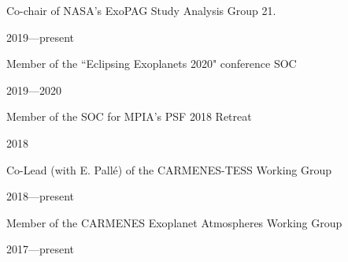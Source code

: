 \documentclass[12pt, a4paper]{article} %
\begin{document}
\vspace{0.2cm}

\begin{minipage}[t]{0.7\textwidth}
\begin{flushleft}%
  \setlength{\leftskip}{0.2cm}%
Co-chair of NASA's ExoPAG Study Analysis Group 21.
\end{flushleft}
\end{minipage}
\begin{minipage}[t]{0.3\textwidth}
\hfill 2019---present
\end{minipage}

\vspace{0.2cm}

\begin{minipage}[t]{0.7\textwidth}
\begin{flushleft}%
  \setlength{\leftskip}{0.2cm}%
Member of the ``Eclipsing Exoplanets 2020" conference SOC
\end{flushleft}
\end{minipage}
\begin{minipage}[t]{0.3\textwidth}
\hfill 2019---2020
\end{minipage}

\vspace{0.2cm}

\begin{minipage}[t]{0.7\textwidth}
\begin{flushleft}%
  \setlength{\leftskip}{0.2cm}%
Member of the SOC for MPIA's PSF 2018 Retreat 
\end{flushleft}
\end{minipage}
\begin{minipage}[t]{0.3\textwidth}
\hfill 2018
\end{minipage}

\vspace{0.2cm}

\begin{minipage}[t]{0.7\textwidth}
\begin{flushleft}%
  \setlength{\leftskip}{0.2cm}%
Co-Lead (with E. Pall\'e) of the CARMENES-TESS Working Group 
\end{flushleft}
\end{minipage}
\begin{minipage}[t]{0.3\textwidth}
\hfill 2018---present
\end{minipage}

\vspace{0.2cm}

\begin{minipage}[t]{0.7\textwidth}
\begin{flushleft}%
  \setlength{\leftskip}{0.2cm}%
Member of the CARMENES Exoplanet Atmospheres Working Group 
\end{flushleft}
\end{minipage}
\begin{minipage}[t]{0.3\textwidth}
\hfill 2017---present
\end{minipage}
\end{document}
